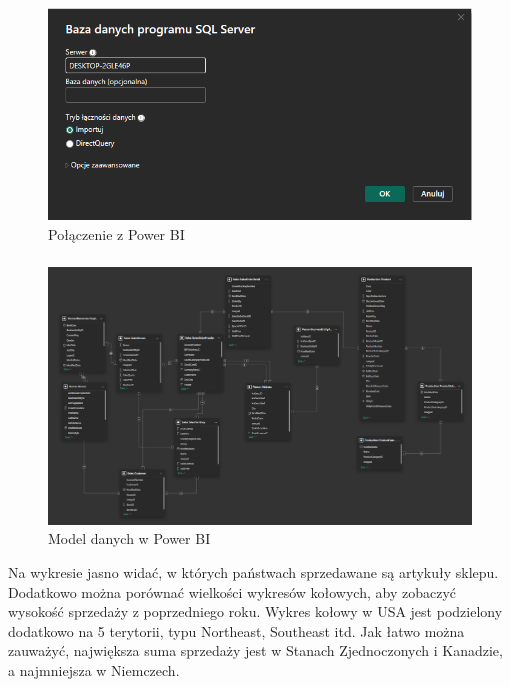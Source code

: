 \documentclass[a4paper,12pt]{article}
\begin{document}
\begin{figure}[H]
    \centering
    \includegraphics[width=1.0\textwidth]{images/power_bi/connection.png}
    \caption{Połączenie z Power BI}
\end{figure}

\subsubsection{}

\begin{figure}[H]
    \centering
    \includegraphics[width=1.0\textwidth]{images/power_bi/model.png}
    \caption{Model danych w Power BI}
\end{figure}

Na wykresie jasno widać, w których państwach sprzedawane są artykuły sklepu. Dodatkowo można porównać wielkości wykresów kołowych, aby zobaczyć wysokość sprzedaży z poprzedniego roku. Wykres kołowy w USA jest podzielony dodatkowo na 5 terytorii, typu Northeast, Southeast itd. Jak łatwo można zauważyć, największa suma sprzedaży jest w Stanach Zjednoczonych i Kanadzie, a najmniejsza w Niemczech.
\end{document}

